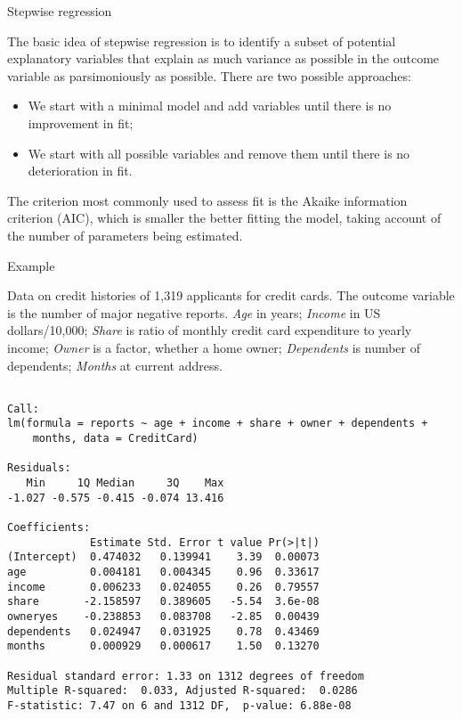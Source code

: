 \documentclass[10pt,ignorenonframetext,]{beamer}
\providecommand{\tightlist}{%
\setlength{\itemsep}{0pt}\setlength{\parskip}{0pt}}
\begin{document}
\begin{frame}{Stepwise regression}

The basic idea of stepwise regression is to identify a subset of
potential explanatory variables that explain as much variance as
possible in the outcome variable as parsimoniously as possible. There
are two possible approaches:

\begin{itemize}
\tightlist
\item
  We start with a minimal model and add variables until there is no
  improvement in fit;
\item
  We start with all possible variables and remove them until there is no
  deterioration in fit.
\end{itemize}

The criterion most commonly used to assess fit is the Akaike information
criterion (AIC), which is smaller the better fitting the model, taking
account of the number of parameters being estimated.

\end{frame}

\begin{frame}[fragile]{Example}

Data on credit histories of 1,319 applicants for credit cards. The
outcome variable is the number of major negative reports. \emph{Age} in
years; \emph{Income} in US dollars/10,000; \emph{Share} is ratio of
monthly credit card expenditure to yearly income; \emph{Owner} is a
factor, whether a home owner; \emph{Dependents} is number of dependents;
\emph{Months} at current address.

\tiny

\begin{verbatim}

Call:
lm(formula = reports ~ age + income + share + owner + dependents +
    months, data = CreditCard)

Residuals:
   Min     1Q Median     3Q    Max
-1.027 -0.575 -0.415 -0.074 13.416

Coefficients:
             Estimate Std. Error t value Pr(>|t|)
(Intercept)  0.474032   0.139941    3.39  0.00073
age          0.004181   0.004345    0.96  0.33617
income       0.006233   0.024055    0.26  0.79557
share       -2.158597   0.389605   -5.54  3.6e-08
owneryes    -0.238853   0.083708   -2.85  0.00439
dependents   0.024947   0.031925    0.78  0.43469
months       0.000929   0.000617    1.50  0.13270

Residual standard error: 1.33 on 1312 degrees of freedom
Multiple R-squared:  0.033, Adjusted R-squared:  0.0286
F-statistic: 7.47 on 6 and 1312 DF,  p-value: 6.88e-08
\end{verbatim}

\end{frame}
\end{document}
